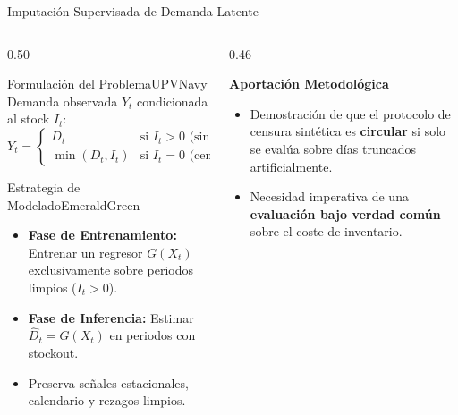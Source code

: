 \documentclass[aspectratio=169, 10pt]{beamer}
\begin{document}
\begin{frame}{Imputación Supervisada de Demanda Latente}
  \begin{columns}[c]
    \begin{column}{0.50\textwidth}
      \begin{statbox}{Formulación del Problema}{UPVNavy}
        Demanda observada $Y_t$ condicionada al stock $I_t$:
        $$Y_t = \begin{cases} D_t & \text{si } I_t > 0 \text{ (sin rotura)} \\ \min(D_t, I_t) & \text{si } I_t = 0 \text{ (censurada)} \end{cases}$$
      \end{statbox}
      \begin{statbox}{Estrategia de Modelado}{EmeraldGreen}
        \begin{itemize}\small
          \item \textbf{Fase de Entrenamiento:} Entrenar un regresor $G(X_t)$ exclusivamente sobre periodos limpios ($I_t > 0$).
          \item \textbf{Fase de Inferencia:} Estimar $\hat{D}_t = G(X_t)$ en periodos con stockout.
          \item Preserva señales estacionales, calendario y rezagos limpios.
        \end{itemize}
      \end{statbox}
    \end{column}
    \begin{column}{0.46\textwidth}
      \begin{herocard}
        \textbf{\textcolor{UPVNavy}{Aportación Metodológica}}
        \vspace{0.2cm}
        \begin{itemize}\small
          \item Demostración de que el protocolo de censura sintética es \textbf{circular} si solo se evalúa sobre días truncados artificialmente.
          \item Necesidad imperativa de una \textbf{evaluación bajo verdad común} sobre el coste de inventario.
        \end{itemize}
      \end{herocard}
    \end{column}
  \end{columns}
\end{frame}
\end{document}
